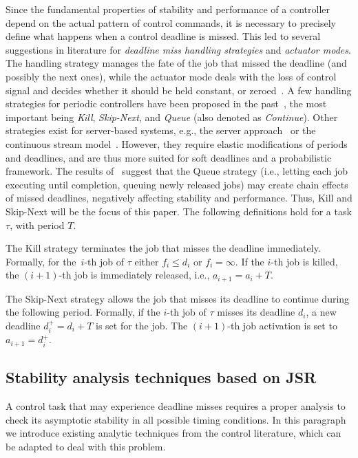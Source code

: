 Since the fundamental properties of stability and performance of a controller depend on the actual pattern of control commands, it is necessary to precisely define what happens when a control deadline is missed.
This led to several suggestions in literature for \emph{deadline miss handling strategies} and \emph{actuator modes}.
The handling strategy manages the fate of the job that missed the deadline (and possibly the next ones), while the actuator mode deals with the loss of control signal and decides whether it should be held constant, or zeroed~\cite{schenato09}.
A few handling strategies for periodic controllers have been proposed in the past~\cite{Cervin:2005,Pazzaglia:2018, Pazzaglia:2019, Maggio:2020,pazzaglia2020generalized}, the most important being \emph{Kill}, \emph{Skip-Next}, and \emph{Queue} (also denoted as \emph{Continue}).
Other strategies exist for server-based systems, e.g., the server approach~\cite{cervin2005control} or the continuous stream model~\cite{fontanelli2013continuous}.
However, they require elastic modifications of periods and deadlines, and are thus more suited for soft deadlines and a probabilistic framework.
The results of~\cite{Cervin:2005,Pazzaglia:2019,Cervin:2019,Maggio:2020} suggest that the Queue strategy (i.e., letting each job executing until completion, queuing newly released jobs) may create chain effects of missed deadlines, negatively affecting stability and performance.
Thus, Kill and Skip-Next will be the focus of this paper.
The following definitions hold for a task $\tau$, with period $T$.

\begin{definition}%
    \label{def:kill}%
    The Kill strategy terminates the job that misses the deadline immediately.
    Formally, for the~$i$-th job of $\tau$ either $f_i\leq d_i$ or $f_i=\infty$.
    If the $i$-th job is killed, the $(i+1)$-th job is immediately released, i.e., $a_{i+1} = a_{i} + T$.
\end{definition}

\begin{definition}%
    \label{def:skip}%
    The Skip-Next strategy allows the job that misses its deadline to continue during the following period.
    Formally, if the $i$-th job of $\tau$ misses its deadline $d_i$, a new deadline $d^{+}_i = d_i + T$ is set for the job.
    The $(i+1)$-th job activation is set to $a_{i+1} = d^{+}_i$.
\end{definition}

\subsection{Stability analysis techniques based on JSR}
\label{sec:existing}
A control task that may experience deadline misses requires a proper analysis to check its asymptotic stability in all possible timing conditions. 
In this paragraph we introduce existing analytic techniques from the control literature, which can be adapted to deal with this problem.


